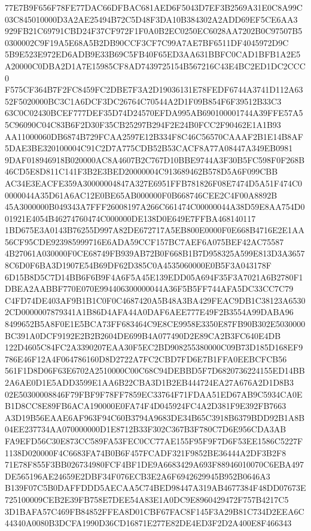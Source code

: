 \documentclass[UTF8,fontset=fandol,zihao=-4,a4paper]{ctexart}
\begin{document}
{{77E7B9F656F78FE77DAC66DFBAC681AED6F5043D7EF3B2569A31E0C8A99C03C845010000D3A2AE25494B72C5D48F3DA10B384302A2ADD69EF5CE6AA3
929FB21C69791CBD24F37CF972F1F0A0B2EC0250EC6028AA7202B0C97507B50300002C9F19A5E68A5B2DB90CCF3CF7C99A7AE7BF6511DF4045972D9C
5B9E523E972ED6ADB9E33B69C5FB40F65ED3AA631BBFC0CAD1BFB1A2E5A20000C0DBA2D1A7E15985CF8AD7439725154B567216C43E4BC2ED1DC2CCC0
F575CF364B7F2FC8459FC2DBE7F3A2D19036131E78FEDF6744A3741D112A6352F5020000BC3C1A6DCF3DC26764C70544A2D1F09B854F6F39512B33C3
63C0C02430BCEF777DEF35D74D24570EFDA995AB690100001744A39FFE57A55C96090C04C83B6F2D30F35CB25297B294F2E24B0FCC2F90462E1A1B93
AA11000060DB6874B729FCAA2597E12B334F8C46C56570CAAAF2B1E14B8AF5DAE3BE320100004C91C2D7A775CDB52B53CACF8A77A08447A349EB0981
9DAF018946918B020000AC8A4607B2C767D10BBE9744A3F30B5FC598F0F268B46CD5E8D811C141F3B2E3BED20000004C913689462B578D5A6F099CBB
AC34E3EACFE359A30000004847A327E6951FFB781826F08E7474D5A51F474C00000044A35D61A6AC12E0BE65AB000000F0B668746CEE2C4F00A8892B
45A3000000B049343A7FFF26008197A266C661474C00000044A38D59E8AA754D001921E4054B46274760474C000000DE138D0E649E7FFBA468140117
1BD675E3A0143B76255D997A82DE672717A5EB800E0000F0E668B4716E2E1AA56CF95CDE923985999716E6ADA59CCF157BC7AEF6A075BEF42AC75587
4B27061A030000F0CE68749FB939AB72B0F668B1B7D958325A599E813D3A36578C6D0F6BA3D1907E54B69DF62D385C0A4535060000E0B5F3A043178F
6D15B8D5C7D14BB6F6B9F4A6F5A45E139EDD05A694F35F3A7021A6B2780F1DBEA2AABBF770E070E994406300000044A36F5B5FF744AFA5DC33CC7C79
C4FD74DE403AF9B1B1C0F0C4687420A5B48A3BA429FEAC9DB1C38123A65302CD0000007879341A1B86D4AFA44A0DAF6AEE777E49F2B3554A99DABA96
8499652B5A8F0E1E5BCA73FF683464C9E8CE9958E3350E87FB90B302E5030000BC391A0DCF9192E2B2B2604DE699B4A077490D2E89CA2B3FC640E4DB
122D4605C84FC2A3390207EAA30F5EC2BD908255380000C09B73D185D168EF9786E46F12A4F064786160D8D2722A7FC2CBD7FD6E7B1FFA0EEBCFCB56
561F1D8D06F63E6702A2510000C00C68C94DEBBD5F7D6820736224155ED14BB2A6AE0D1E5ADD3599E1AA6B22CBA3D1B2EB444724EA27A676A2D1D8B3
02E50300008846F79FBF9F78FF7859EC33764F71FDAA51ED67AB9C5934CA0EB1D8CC8E89FB6ACA190000E0FA74F4D045924FC4A2D381F9E392FB7663
A3D19B56EAAE6AF963F94C60B3794A9683DE34B65C3918B6379BDD92B1A8B04EE237734AA070000000D1E8712B33F302C367B3F780C7D6E956CDA3AB
FA9EFD56C30E873CC589FA53FEC0CC77AE155F95F9F7D6F53EE1586C5227F1138D020000F4C6683FA74B0B6F457FCADF321F9852BE36444A2DF3B2F8
71E78F855F3BB026734980FCF4BF1DE9A6683429A693F88946010070C6EBA497DE565196AE24659E2DBF34F076ECB3E2A6F6942629945B952B0646A3
B139F07C5B0DAFFDDD5AECAA5C74BED98447A319AB4677384F48DD07673E725100009CEB2E39FB758E7DEE54A83E1A0DC9E8960429472F757B4217C5
3D1BAFA57C469FB84852FFEA8D01CBF67FAC8F145F3A29B81C734D2EEA6C44340A0080B3DCFA1990D36CD16871E277E82DE4ED3F2D2A400E8F466343
}}
\end{document}
